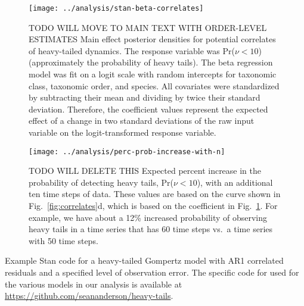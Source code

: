 \clearpage

\begin{figure}[htbp]
\begin{center}
\texttt{[image: ../analysis/stan-beta-correlates]}
\caption{
TODO WILL MOVE TO MAIN TEXT WITH ORDER-LEVEL ESTIMATES
  Main effect posterior densities for potential correlates of heavy-tailed
  dynamics. The response variable was Pr($\nu < 10$) (approximately the
  probability of heavy tails). The beta regression model was fit on a logit
  scale with random intercepts for taxonomic class, taxonomic order, and
  species. All covariates were standardized by subtracting their mean and
  dividing by twice their standard deviation. Therefore, the coefficient values
  represent the expected effect of a change in two standard deviations of the
  raw input variable on the logit-transformed response variable.
}
    \label{fig:correlate-coefs}
\end{center}
\end{figure}

\clearpage

\begin{figure}[htbp]
\begin{center}
\texttt{[image: ../analysis/perc-prob-increase-with-n]}
\caption{
TODO WILL DELETE THIS
Expected percent increase in the probability of detecting heavy tails, Pr($\nu
< 10$), with an additional ten time steps of data. These values are based on
the curve shown in Fig.~\ref{fig:correlates}d, which is based on the
coefficient in Fig.~\ref{fig:correlate-coefs}. For example, we have about
a 12\% increased probability of observing heavy tails in a time series that has
60 time steps vs.\ a time series with 50 time steps.
}
\label{fig:perc-inc-p}
\end{center}
\end{figure}

\clearpage

\noindent
Example Stan code for a heavy-tailed Gompertz model with AR1 correlated
residuals and a specified level of observation error. The specific code for used for the various models in our analysis is available at \url{https://github.com/seananderson/heavy-tails}.


